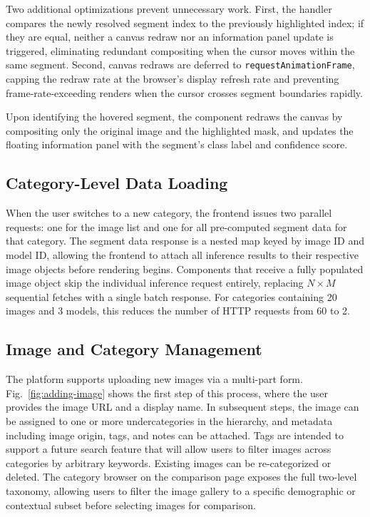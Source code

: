 \documentclass[conference,a4paper,flushend]{iaria}
\begin{document}
Two additional optimizations prevent unnecessary work. First, the handler compares the newly resolved segment index to the previously highlighted index; if they are equal, neither a canvas redraw nor an information panel update is triggered, eliminating redundant compositing when the cursor moves within the same segment. Second, canvas redraws are deferred to \texttt{requestAnimationFrame}, capping the redraw rate at the browser's display refresh rate and preventing frame-rate-exceeding renders when the cursor crosses segment boundaries rapidly.

Upon identifying the hovered segment, the component redraws the canvas by compositing only the original image and the highlighted mask, and updates the floating information panel with the segment's class label and confidence score.

\subsection{Category-Level Data Loading}

When the user switches to a new category, the frontend issues two parallel requests: one for the image list and one for all pre-computed segment data for that category. The segment data response is a nested map keyed by image ID and model ID, allowing the frontend to attach all inference results to their respective image objects before rendering begins. Components that receive a fully populated image object skip the individual inference request entirely, replacing $N \times M$ sequential fetches with a single batch response. For categories containing 20 images and 3 models, this reduces the number of HTTP requests from 60 to 2.

\subsection{Image and Category Management}

The platform supports uploading new images via a multi-part form. Fig.~\ref{fig:adding-image} shows the first step of this process, where the user provides the image URL and a display name. In subsequent steps, the image can be assigned to one or more undercategories in the hierarchy, and metadata including image origin, tags, and notes can be attached. Tags are intended to support a future search feature that will allow users to filter images across categories by arbitrary keywords. Existing images can be re-categorized or deleted. The category browser on the comparison page exposes the full two-level taxonomy, allowing users to filter the image gallery to a specific demographic or contextual subset before selecting images for comparison.
\end{document}
